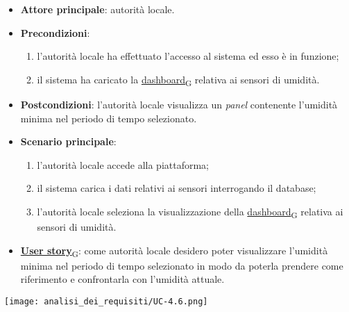 \begin{itemize}
	\item \textbf{Attore principale}: autorità locale.
	\item \textbf{Precondizioni}:
	      \begin{enumerate}
		      \item l'autorità locale ha effettuato l'accesso al sistema ed esso è in funzione;
		      \item il sistema ha caricato la \href{https://7last.github.io/docs/rtb/documentazione-interna/glossario\#dashboard}{dashboard\textsubscript{G}} relativa ai sensori di umidità.
	      \end{enumerate}
	\item \textbf{Postcondizioni}: l'autorità locale visualizza un \textit{panel} contenente l'umidità minima nel periodo di tempo selezionato.
	\item \textbf{Scenario principale}:
	      \begin{enumerate}
		      \item l'autorità locale accede alla piattaforma;
		      \item il sistema carica i dati relativi ai sensori interrogando il database;
		      \item l'autorità locale seleziona la visualizzazione della \href{https://7last.github.io/docs/rtb/documentazione-interna/glossario\#dashboard}{dashboard\textsubscript{G}} relativa ai sensori di umidità.
	      \end{enumerate}
	\item \href{https://7last.github.io/docs/rtb/documentazione-interna/glossario\#user-story}{\textbf{User story}\textsubscript{G}}:
	      come autorità locale desidero poter visualizzare l'umidità minima nel periodo di tempo selezionato
	      in modo da poterla prendere come riferimento e confrontarla con l'umidità attuale.
\end{itemize}
\begin{center}
	\texttt{[image: analisi\_dei\_requisiti/UC-4.6.png]}
\end{center}

